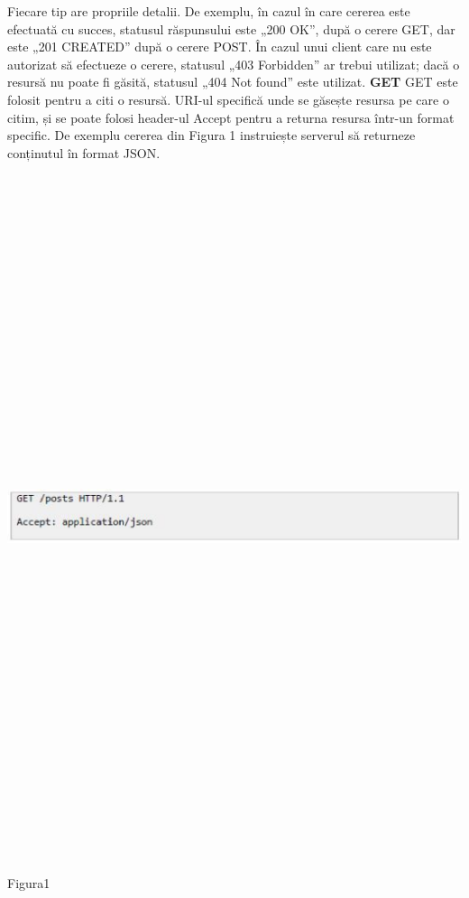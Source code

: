 Fiecare tip are propriile detalii. De exemplu, în cazul în care cererea este efectuată cu succes, statusul răspunsului este „200 OK”, după o cerere GET, dar este „201 CREATED” după o cerere POST. În cazul unui client care nu este autorizat să efectueze o cerere, statusul „403 Forbidden” ar trebui utilizat; dacă o resursă nu poate fi găsită, statusul „404 Not found” este utilizat.
\textbf{GET}
GET este folosit pentru a citi o resursă. URI-ul specifică unde se găsește resursa pe care o citim, și se poate folosi header-ul Accept pentru a returna resursa într-un format specific. De exemplu cererea din Figura 1 instruiește serverul să returneze conținutul în format JSON. 
\begin{center}
\includegraphics[width=15cm,height=20cm]{imagini/get.eps} 
\caption{Figura1}
\end{center}


